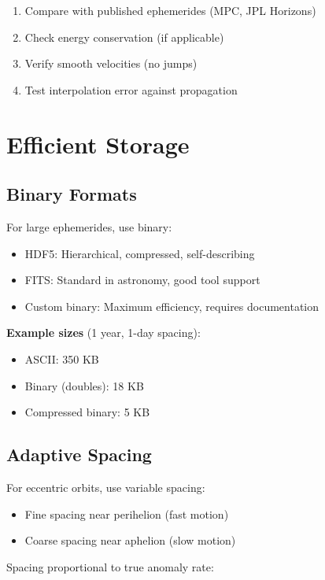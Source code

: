 \begin{enumerate}
    \item Compare with published ephemerides (MPC, JPL Horizons)
    \item Check energy conservation (if applicable)
    \item Verify smooth velocities (no jumps)
    \item Test interpolation error against propagation
\end{enumerate}

\section{Efficient Storage}

\subsection{Binary Formats}

For large ephemerides, use binary:

\begin{itemize}
    \item HDF5: Hierarchical, compressed, self-describing
    \item FITS: Standard in astronomy, good tool support
    \item Custom binary: Maximum efficiency, requires documentation
\end{itemize}

\textbf{Example sizes} (1 year, 1-day spacing):
\begin{itemize}
    \item ASCII: 350 KB
    \item Binary (doubles): 18 KB
    \item Compressed binary: 5 KB
\end{itemize}

\subsection{Adaptive Spacing}

For eccentric orbits, use variable spacing:
\begin{itemize}
    \item Fine spacing near perihelion (fast motion)
    \item Coarse spacing near aphelion (slow motion)
\end{itemize}

Spacing proportional to true anomaly rate:


